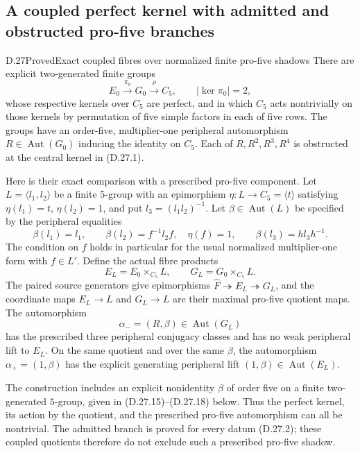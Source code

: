\subsection{A coupled perfect kernel with admitted and obstructed pro-five branches}

\begin{statement}{D.27}{Proved}{Exact coupled fibres over normalized finite pro-five shadows}
There are explicit two-generated finite groups
\[
 E_0\xrightarrow{\pi_0}G_0\xrightarrow{\rho}C_5,
 \qquad |\ker\pi_0|=2,
 \tag{D.27.1}
\]
whose respective kernels over $C_5$ are perfect, and in which
$C_5$ acts nontrivially on those kernels by permutation of five
simple factors in each of five rows.  The groups have an
order-five, multiplier-one peripheral automorphism
$R\in\operatorname{Aut}(G_0)$ inducing the identity on $C_5$.
Each of $R,R^2,R^3,R^4$ is obstructed at the central kernel in
\textup{(D.27.1)}.

Here is their exact comparison with a prescribed pro-five
component.  Let $L=\langle l_1,l_2\rangle$ be a finite
$5$-group with an epimorphism
$\eta:L\to C_5=\langle t\rangle$ satisfying
$\eta(l_1)=t$, $\eta(l_2)=1$, and put
$l_3=(l_1l_2)^{-1}$.  Let $\beta\in\operatorname{Aut}(L)$
be specified by the peripheral equalities
\[
 \beta(l_1)=l_1,\qquad
 \beta(l_2)=f^{-1}l_2f,\quad \eta(f)=1,
 \qquad\beta(l_3)=h l_3h^{-1}.
 \tag{D.27.2}
\]
The condition on $f$ holds in particular for the usual
normalized multiplier-one form with $f\in L'$.
Define the actual fibre products
\[
 E_L=E_0\times_{C_5}L,
 \qquad G_L=G_0\times_{C_5}L.
 \tag{D.27.3}
\]
The paired source generators give epimorphisms
$\widehat F\twoheadrightarrow E_L\twoheadrightarrow G_L$,
and the coordinate maps $E_L\to L$ and $G_L\to L$ are their
maximal pro-five quotient maps.  The automorphism
\[
 \alpha_-=(R,\beta)\in\operatorname{Aut}(G_L)
 \tag{D.27.4}
\]
has the prescribed three peripheral conjugacy classes and
has no weak peripheral lift to $E_L$.  On the same quotient
and over the same $\beta$, the automorphism
$\alpha_+=(1,\beta)$ has the explicit generating peripheral
lift $(1,\beta)\in\operatorname{Aut}(E_L)$.

The construction includes an explicit nonidentity $\beta$ of
order five on a finite two-generated $5$-group, given in
\textup{(D.27.15)--(D.27.18)} below.  Thus the perfect kernel,
its action by the quotient, and the prescribed pro-five
automorphism can all be nontrivial.  The admitted branch is
proved for every datum \textup{(D.27.2)}; these coupled
quotients therefore do not exclude such a prescribed
pro-five shadow.
\end{statement}


